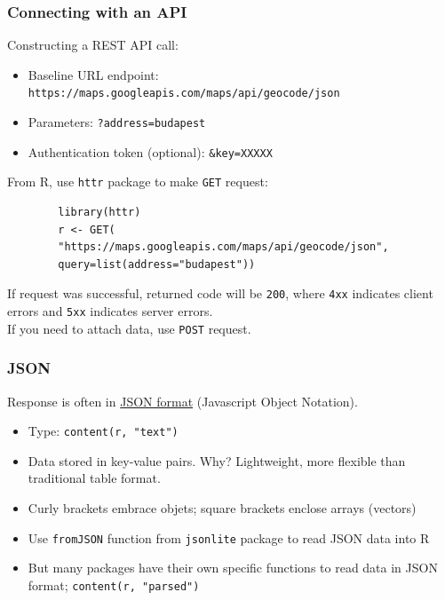 \documentclass{beamer}
\begin{document}
\begin{frame}[fragile]
	\frametitle{Connecting with an API}
	
	Constructing a REST API call:
	\vspace{.20cm}
	\begin{itemize}
		\item Baseline URL \alert{endpoint}: \scriptsize{\texttt{https://maps.googleapis.com/maps/api/geocode/json}}
		\item Parameters: \texttt{?address=budapest}
		\item Authentication token (optional): \texttt{\&key=XXXXX}
	\end{itemize}
	\vspace{.20cm}
	From R, use \texttt{httr} package to make \texttt{GET} request:\\
	\vspace{.10cm}
	\begin{small}
		\begin{verbatim}
		library(httr)
		r <- GET(
		"https://maps.googleapis.com/maps/api/geocode/json",
		query=list(address="budapest"))
		\end{verbatim}
	\end{small}
	If request was successful, returned code will be \texttt{200}, where \texttt{4xx} indicates client errors and \texttt{5xx} indicates server errors.\\
	If you need to attach data, use \texttt{POST} request.
	
\end{frame}


\begin{frame}[fragile]
	\frametitle{JSON}
	Response is often in \href{https://maps.googleapis.com/maps/api/geocode/json?address=budapest}{JSON format} (Javascript Object Notation). \\ \pause
	\begin{itemize}[<+->]
		\item Type: \verb|content(r, "text")|
		\item Data stored in key-value pairs. Why? Lightweight, more flexible than traditional table format.
		\item Curly brackets embrace objets; square brackets enclose arrays (vectors)
		\item Use \texttt{fromJSON} function from \texttt{jsonlite} package to read JSON data into R
		\item But many packages have their own specific functions to read data in JSON format; \verb|content(r, "parsed")|
	\end{itemize}
	
	
	
\end{frame}
\end{document}
